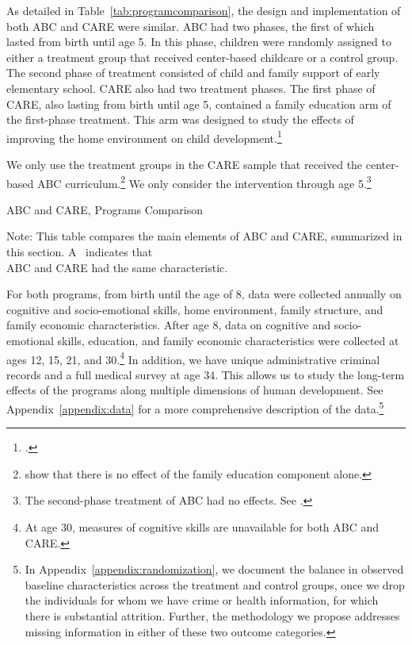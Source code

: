 As detailed in Table~\ref{tab:programcomparison}, the design and implementation of both ABC and CARE were similar. ABC had two phases, the first of which lasted from birth until age 5. In this phase, children were randomly assigned to either a treatment group that received center-based childcare or a control group. The second phase of treatment consisted of child and family support of early elementary school. CARE also had two treatment phases. The first phase of CARE, also lasting from birth until age 5, contained a family education arm of the first-phase treatment. This arm was designed to study the effects of improving the home environment on child development.\footnote{\citet{Wasik_Ramey_etal_1990_CD}.}

We only use the treatment groups in the CARE sample that received the center-based ABC curriculum.\footnote{\citet{ABCCARE_Dataset} show that there is no effect of the family education component alone.} We only consider the intervention through age 5.\footnote{The second-phase treatment of ABC had no effects. See \citealp{Campbell_Conti_etal_2014_EarlyChildhoodInvestments}.}

\begin{table}[htbp]
\centering
\begin{threeparttable}
\caption{ABC and CARE, Programs Comparison} \label{tab:programcomparison}
\footnotesize
\centerline{
	\scalebox{0.8}{
	
	}
}
\footnotesize
\begin{tablenotes}
\item Note: This table compares the main elements of ABC and CARE, summarized in this section. A \checkmark\ indicates that  \\ ABC and CARE had the same characteristic.
\end{tablenotes}
\end{threeparttable}%
\end{table}


For both programs, from birth until the age of 8, data were collected annually on cognitive and socio-emotional skills, home environment, family structure, and family economic characteristics. After age 8, data on cognitive and socio-emotional skills, education, and family economic characteristics were collected at ages 12, 15, 21, and 30.\footnote{At age 30, measures of cognitive skills are unavailable for both ABC and CARE.} In addition, we have unique administrative criminal records and a full medical survey at age 34. This allows us to study the long-term effects of the programs along multiple dimensions of human development. See Appendix~\ref{appendix:data} for a more comprehensive description of the data.\footnote{In Appendix~\ref{appendix:randomization}, we document the balance in observed baseline characteristics across the treatment and control groups, once we drop the individuals for whom we have crime or health information, for which there is substantial attrition. Further, the methodology we propose addresses missing information in either of these two outcome categories.}

